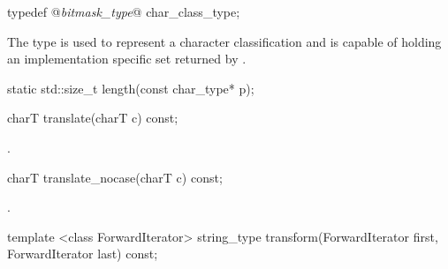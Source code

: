 %
%
\begin{itemdecl}
typedef @\textit{bitmask_type}@                 char_class_type; 
\end{itemdecl}

\begin{itemdescr}
\pnum
The type  is used to represent a character
classification and is capable of holding an implementation specific
set returned by .
\end{itemdescr}

%
%
\begin{itemdecl}
static std::size_t length(const char_type* p); 
\end{itemdecl}

\begin{itemdescr}
\pnum\returns {}
\end{itemdescr}

%
%
\begin{itemdecl}
charT translate(charT c) const; 
\end{itemdecl}

\begin{itemdescr}
\pnum\returns {}.
\end{itemdescr}

%
%
\begin{itemdecl}
charT translate_nocase(charT c) const; 
\end{itemdecl}

\begin{itemdescr}
\pnum\returns  {}.
\end{itemdescr}

%
%
\begin{itemdecl}
template <class ForwardIterator>
  string_type transform(ForwardIterator first, ForwardIterator last) const; 
\end{itemdecl}

